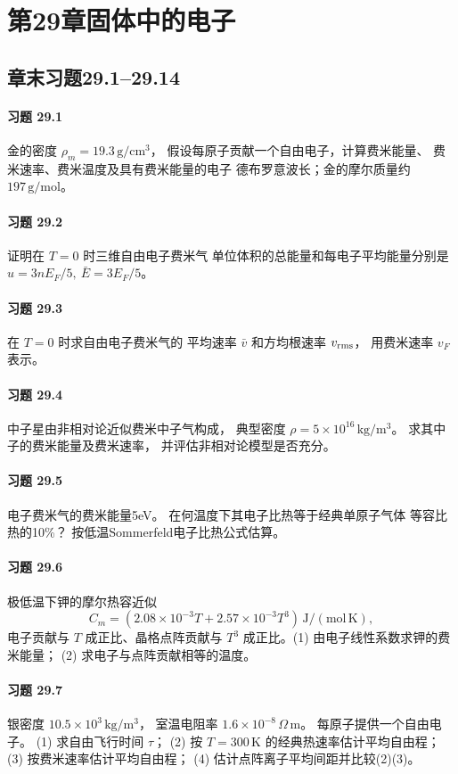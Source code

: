 \section*{第29章\quad 固体中的电子}
\subsection*{章末习题29.1--29.14}
\paragraph{习题 29.1}
金的密度 \(\rho_m=19.3\,\mathrm{g/cm^3}\)，
假设每原子贡献一个自由电子，计算费米能量、
费米速率、费米温度及具有费米能量的电子
德布罗意波长；金的摩尔质量约
\(197\,\mathrm{g/mol}\)。
\paragraph{习题 29.2}
证明在 \(T=0\) 时三维自由电子费米气
单位体积的总能量和每电子平均能量分别是
\(u=3nE_F/5,\ \bar E=3E_F/5\)。
\paragraph{习题 29.3}
在 \(T=0\) 时求自由电子费米气的
平均速率 \(\bar v\) 和方均根速率 \(v_{\rm rms}\)，
用费米速率 \(v_F\) 表示。
\paragraph{习题 29.4}
中子星由非相对论近似费米中子气构成，
典型密度 \(\rho=5\times10^{16}\,\mathrm{kg/m^3}\)。
求其中子的费米能量及费米速率，
并评估非相对论模型是否充分。
\paragraph{习题 29.5}
电子费米气的费米能量5eV。
在何温度下其电子比热等于经典单原子气体
等容比热的10\%？
按低温Sommerfeld电子比热公式估算。
\paragraph{习题 29.6}
极低温下钾的摩尔热容近似
\[
C_m=(2.08\times10^{-3}T+
2.57\times10^{-3}T^3)\,\mathrm{J/(mol\,K)},
\]
电子贡献与 \(T\) 成正比、晶格点阵贡献与 \(T^3\)
成正比。(1) 由电子线性系数求钾的费米能量；
(2) 求电子与点阵贡献相等的温度。
\paragraph{习题 29.7}
银密度 \(10.5\times10^3\,\mathrm{kg/m^3}\)，
室温电阻率 \(1.6\times10^{-8}\,\Omega\,\mathrm m\)。
每原子提供一个自由电子。
(1) 求自由飞行时间 \(\tau\)；
(2) 按 \(T=300\,\mathrm K\) 的经典热速率估计平均自由程；
(3) 按费米速率估计平均自由程；
(4) 估计点阵离子平均间距并比较(2)(3)。
